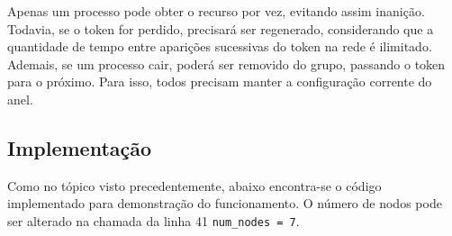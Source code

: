 \documentclass[10pt,conference]{IEEEtran}
\begin{document}
Apenas um processo pode obter o recurso por vez, evitando assim inanição. Todavia, se o token for perdido, precisará ser regenerado, considerando que a quantidade de tempo entre aparições sucessivas do token na rede é ilimitado. Ademais, se um processo cair, poderá ser removido do grupo, passando o token para o próximo. Para isso, todos precisam manter a configuração corrente do anel. \cite{tanenbaum}

\subsection{Implementação}
Como no tópico visto precedentemente, abaixo encontra-se o código implementado para demonstração do funcionamento. O número de nodos pode ser alterado na chamada da linha 41 \verb|num_nodes = 7|. 
\end{document}
